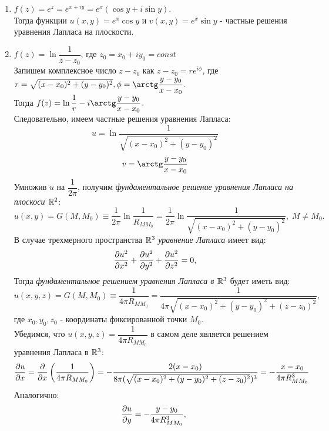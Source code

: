 \documentclass[../main.tex]{subfiles}
\begin{document}
    \begin{enumerate}
        \item $f(z) = e^z = e^{x+iy} = e^x(\cos{y}+i\sin{y})$.\\ Тогда функции $u(x,y) = e^x\cos{y}$ и $v(x,y) = e^x\sin{y}$ - частные решения уравнения Лапласа на плоскости.
        \item $f(z) = \ln{\dfrac{1}{z-z_0}}$, где $z_0 = x_0 + iy_0 = const$\\
        Запишем комплексное число $z-z_0$ как $z-z_0=re^{i\phi}$, где $r = \sqrt{(x-x_0)^2 + (y - y_0)^2},\\\phi = \arctg\dfrac{y-y_0}{x-x_0}.$\\
        Тогда $f(z) = \ln{\dfrac{1}{r}} - i\arctg\dfrac{y-y_0}{x-x_0}.$\\
        Следовательно, имеем частные решения уравнения Лапласа:
        \[
            u = \ln{\dfrac{1}{\sqrt{(x-x_0)^2 + (y - y_0)^2}}}
        \]
        \[
            v = \arctg\dfrac{y-y_0}{x-x_0}
        \]
        Умножив $u$ на $\dfrac{1}{2\pi}$, получим \textit{фундаментальное решение уравнения Лапласа на плоскоси $\mathbb{R}^2$}:
        \begin{equation}
            u(x, y) = G(M, M_0) \equiv \dfrac{1}{2\pi}\ln{\dfrac{1}{R_{MM_0}}} =  \dfrac{1}{2\pi}\ln{\dfrac{1}{\sqrt{(x-x_0)^2 + (y - y_0)^2}}},\; M \ne M_0.
        \end{equation}
        В случае трехмерного пространства $\mathbb{R}^3$ \textit{уравнение Лапласа} имеет вид:
        \begin{equation}
            \pderivTwo{u}{x}{x} + \pderivTwo{u}{y}{y} + \pderivTwo{u}{z}{z} = 0,
        \end{equation}
        Тогда \textit{фундаментальное решением уравнения Лапласа в $\mathbb{R}^3$} будет иметь вид:
        \begin{equation}
            u(x, y, z) = G(M, M_0) \equiv \dfrac{1}{4\pi R_{MM_0}} =  \dfrac{1}{4\pi{\sqrt{(x-x_0)^2 + (y - y_0)^2 + (z - z_0)^2}}},
        \end{equation}
        где $x_0, y_0, z_0$ - координаты фиксированной точки $M_0$.\\
        Убедимся, что $u(x, y, z) = \dfrac{1}{4\pi R_{MM_0}}$ в самом деле является решением уравнения Лапласа в $\mathbb{R}^3$:
        \[
            \frac{\partial u}{\partial x} = \frac{\partial}{\partial x}\left(\dfrac{1}{4\pi R_{MM_0}}\right) =  - \dfrac{2(x-x_0)}{{8\pi(\sqrt{(x-x_0)^2 + (y - y_0)^2 + (z - z_0)^2}})^3} = - \dfrac{x-x_0}{4\pi R_{MM_0}^3}
        \]
        Аналогично:
        \[
            \frac{\partial u}{\partial y} = - \dfrac{y-y_0}{4\pi R_{MM_0}^3},\;
\]
\end{enumerate}
\end{document}
